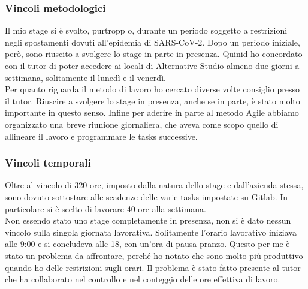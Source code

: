 \subsubsection{Vincoli metodologici}
Il mio stage si è svolto, purtropp o, durante un periodo soggetto a restrizioni negli spostamenti dovuti all'epidemia di SARS-CoV-2. Dopo un
periodo iniziale, però, sono riuscito a svolgere lo stage in parte in presenza. Quinid ho concordato con il tutor di poter accedere ai locali di
Alternative Studio almeno due giorni a settimana, solitamente il lunedì e il venerdì. \\
Per quanto riguarda il metodo di lavoro ho cercato diverse volte consiglio presso il tutor. Riuscire a svolgere lo stage in presenza, anche
se in parte, è stato molto importante in questo senso. Infine per aderire in parte al metodo \gls{Agile} abbiamo organizzato una breve riunione
giornaliera, che aveva come scopo quello di allineare il lavoro e programmare le tasks successive.

\subsubsection{Vincoli temporali}
Oltre al vincolo di 320 ore, imposto dalla natura dello stage e dall'azienda stessa, sono dovuto sottostare alle scadenze delle varie tasks
impostate su Gitlab. In particolare si è scelto di lavorare 40 ore alla settimana. \\
Non essendo stato  uno stage completamente in presenza, non si è dato nessun vincolo sulla singola giornata lavorativa. Solitamente l'orario
lavorativo iniziava alle 9:00 e si concludeva alle 18, con un'ora di pausa pranzo. Questo per me è stato un problema da affrontare, perché
ho notato che sono molto più produttivo quando ho delle restrizioni sugli orari. Il problema è stato fatto presente al tutor che ha
collaborato nel controllo e nel conteggio delle ore effettiva di lavoro.
